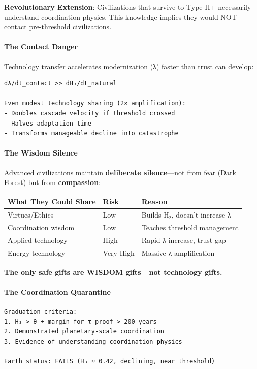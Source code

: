 \documentclass[11pt,letterpaper]{article}
\begin{document}
\textbf{Revolutionary Extension}: Civilizations that survive to Type II+
necessarily understand coordination physics. This knowledge implies they
would NOT contact pre-threshold civilizations.

\paragraph{The Contact Danger}\label{the-contact-danger}

Technology transfer accelerates modernization (λ) faster than trust can
develop:

\begin{verbatim}
dλ/dt_contact >> dH₃/dt_natural

Even modest technology sharing (2× amplification):
- Doubles cascade velocity if threshold crossed
- Halves adaptation time
- Transforms manageable decline into catastrophe
\end{verbatim}

\paragraph{The Wisdom Silence}\label{the-wisdom-silence}

Advanced civilizations maintain \textbf{deliberate silence}---not from
fear (Dark Forest) but from \textbf{compassion}:

\begin{longtable}[]{@{}lll@{}}
\toprule\noalign{}
What They Could Share & Risk & Reason \\
\midrule\noalign{}
\endhead
\bottomrule\noalign{}
\endlastfoot
Virtues/Ethics & Low & Builds H₃, doesn't increase λ \\
Coordination wisdom & Low & Teaches threshold management \\
Applied technology & High & Rapid λ increase, trust gap \\
Energy technology & Very High & Massive λ amplification \\
\end{longtable}

\textbf{The only safe gifts are WISDOM gifts---not technology gifts.}

\paragraph{The Coordination
Quarantine}\label{the-coordination-quarantine}

\begin{verbatim}
Graduation_criteria:
1. H₃ > θ + margin for τ_proof > 200 years
2. Demonstrated planetary-scale coordination
3. Evidence of understanding coordination physics

Earth status: FAILS (H₃ ≈ 0.42, declining, near threshold)
\end{verbatim}
\end{document}
